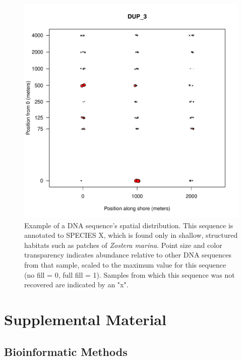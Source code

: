 \documentclass[11pt,letterpaper]{article} %
\begin{document}

\begin{figure}[h!] %
  \centering
    \includegraphics[width=1\textwidth]{../../Figures/otu_in_space.pdf}
    \caption{Example of a DNA sequence's spatial distribution. This sequence is annotated to SPECIES X, which is found only in shallow, structured habitats such as patches of \textit{Zostera marina}. Point size and color transparency indicates abundance relative to other DNA sequences from that sample, scaled to the maximum value for this sequence (no fill = 0, full fill = 1). Samples from which this sequence was not recovered are indicated by an "x".}
  \label{otu_in_space} %
\end{figure}


\section*{Supplemental Material}

\subsection*{Bioinformatic Methods}
\end{document}
